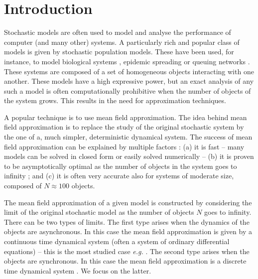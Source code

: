 \documentclass{amsart}
\begin{document}

\section{Introduction}
\label{sect:introduction}

Stochastic models are often used to model and analyse the performance
of computer (and many other) systems. A particularly rich and popular
class of models is given by stochastic population models. These have
been used, for instance, to model biological systems
\cite{wilkinson2006}, epidemic spreading \cite{andersson2000} or
queuing networks \cite{vvedenskaya1996queueing}. These systems are
composed of a set of homogeneous objects interacting with one
another. These models have a high expressive power, but an exact
analysis of any such a model is often computationally prohibitive when
the number of objects of the system grows. This results in the need
for approximation techniques.

A popular technique is to use mean field approximation. The idea
behind mean field approximation is to replace the study of the
original stochastic system by the one of a, much simpler,
deterministic dynamical system.  The success of mean field
approximation can be explained by multiple factors : (a) it is fast --
many models can be solved in closed form
\cite{vvedenskaya1996queueing,mitzenmacher2001power,tsitsiklis2011power,minnebo2}
or easily solved numerically
\cite{massoulie1,gast2010mean,van2013mean} -- (b) it is proven to be
asymptotically optimal as the number of objects in the system goes to
infinity
\cite{kurtz70,Le+07,benaim2008class,gast2012markov,BHLM13};
and (c) it is often very accurate also for systems of moderate size,
composed of $N\approx100$ objects.

The mean field approximation of a given model is constructed by
considering the limit of the original stochastic model as the number
of objects $N$ goes to infinity. There can be two types of limits. The
first type arises when the dynamics of the objects are
asynchronous. In this case the mean field approximation is given by a
continuous time dynamical system (often a system of ordinary
differential equations) -- this is the most studied case \emph{e.g.}
\cite{kurtz70,benaim2008class,BHLM13}.  The second
type arises when the objects are synchronous. In this case
the mean field approximation is a discrete time dynamical system
\cite{Le+07,gastgaujalDEDS,tinnakornsrisuphap2003limit}. We focus on
the latter.
\end{document}
